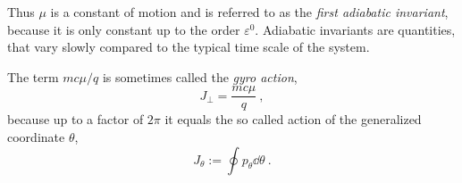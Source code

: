 \documentclass{scrartcl}
\renewcommand{\vec}[1]{\boldsymbol{#1}}
\newcommand{\uv}[1]{\hat{\vec{#1}}}
\newcommand{\rvgc}{\vec{R}} %
\newcommand{\PSL}{\mathcal{L}}
\begin{document}
Thus $\mu$ is a constant of motion and is referred to as the \emph{first adiabatic invariant}, because it is only constant up to the order $\varepsilon^0$. Adiabatic invariants are quantities, that vary slowly compared to the typical time scale of the system.

The term $mc\mu/q$ is sometimes called the \emph{gyro action},
\begin{equation}\label{eq:gyroaction}
    J_\perp = \frac{mc\mu}{q} \ ,
\end{equation}
because up to a factor of $2\pi$ it equals the so called action of the generalized coordinate $\theta$,
\begin{equation*}
    J_\theta := \oint p_\theta \dd{\theta} \ .
\end{equation*}

\end{document}

